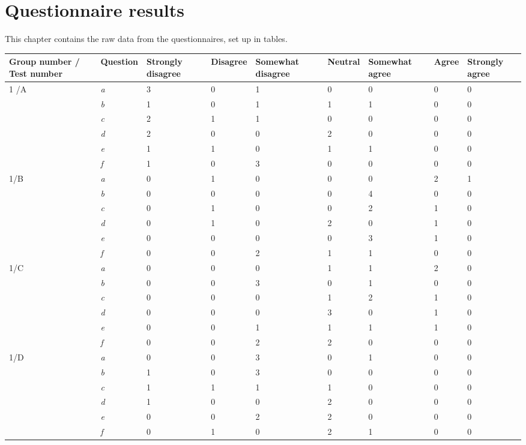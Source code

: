 \chapter{Questionnaire results}\label{ch:EvalResults}
This chapter contains the raw data from the questionnaires, set up in tables.

\begin{center}\small \label{Test1}
	\begin{tabular}{ p{1.4cm} | p{1.4cm} | p{1.3cm} | p{1.4cm} | p{1.7cm} | p{1.2cm} | p{1.7cm} | p{0.9cm}| p{1.3cm} |}
\hline
\textbf{Group number / Test 	number} &\textbf{Question}	&	\textbf{Strongly disagree}	&	\textbf{Disagree}	&	\textbf{Somewhat disagree}	&	\textbf{Neutral}	&	\textbf{Somewhat agree}	&	\textbf{Agree}	&	\textbf{Strongly agree} \\ \hline
1 /A	& 	\textit{a}	&	3	&	0	&	1	&	0	&	0	&	0	&	0 \\ \hline
		&	\textit{b}	&	1	&	0	&	1	&	1	&	1	&	0	&	0 \\ \hline
		&	\textit{c}	&	2	&	1	&	1	&	0	&	0	&	0	&	0	\\ \hline
		&	\textit{d}	&	2	&	0	&	0	&	2	&	0	&	0	&	0 \\ \hline
		&	\textit{e}	&	1	&	1	&	0	&	1	&	1	&	0	&	0 \\ \hline
		&	\textit{f}	&	1	&	0	&	3	&	0	&	0	&	0	&	0	\\ \hline
1/B		&	\textit{a}	&	0	&	1	&	0	&	0	&	0	&	2	&	1 	\\ \hline
		&	\textit{b}	&	0	&	0	&	0	&	0	&	4	&	0	&	0	\\ \hline
		&	\textit{c}	&	0	&	1	&	0	&	0	&	2	&	1	&	0	\\ \hline
		&	\textit{d}	&	0	&	1	&	0	&	2	&	0	&	1	&	0	\\ \hline
		&	\textit{e}	&	0	&	0	&	0	&	0	&	3	&	1	&	0	\\ \hline
		&	\textit{f}	&	0	&	0	&	2	&	1	&	1	&	0	&	0	\\ \hline
1/C		&	\textit{a}	&	0	&	0	&	0	&	1	&	1	&	2	&	0	\\ \hline
		&	\textit{b}	&	0	&	0	&	3	&	0	&	1	&	0	&	0	\\ \hline
		&	\textit{c}	&	0	&	0	&	0	&	1	&	2	&	1	&	0	\\ \hline
		&	\textit{d}	&	0	&	0	&	0	&	3	&	0	&	1	&	0	\\ \hline
		&	\textit{e}	&	0	&	0	&	1	&	1	&	1	&	1	&	0	\\ \hline
		&	\textit{f}	&	0	&	0	&	2	&	2	&	0	&	0	&	0	\\ \hline
1/D		&	\textit{a}	&	0	&	0	&	3	&	0	&	1	&	0	&	0	\\ \hline
		&	\textit{b}	&	1	&	0	&	3	&	0	&	0	&	0	&	0	\\ \hline
		&	\textit{c}	&	1	&	1	&	1	&	1	&	0	&	0	&	0	\\ \hline
		&	\textit{d}	&	1	&	0	&	0	&	2	&	0	&	0	&	0	\\ \hline
		&	\textit{e}	&	0	&	0	&	2	&	2	&	0	&	0	&	0	\\ \hline
		&	\textit{f}	&	0	&	1	&	0	&	2	&	1	&	0	&	0	\\ \hline
		
	\end{tabular}
\end{center}
